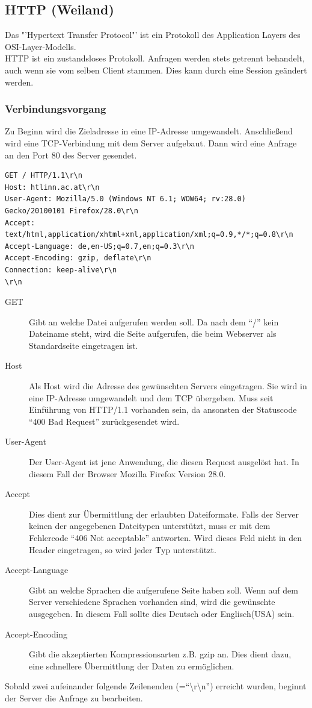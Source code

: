 \subsection{HTTP (Weiland)}

Das "'Hypertext Transfer Protocol"' ist ein Protokoll des Application Layers des OSI-Layer-Modells.
\\
HTTP ist ein zustandsloses Protokoll. Anfragen werden stets getrennt behandelt, auch wenn sie vom selben Client stammen. Dies kann durch eine Session geändert werden.
\subsubsection{Verbindungsvorgang}
Zu Beginn wird die Zieladresse in eine IP-Adresse umgewandelt.
Anschließend wird eine TCP-Verbindung  mit dem Server aufgebaut. 
Dann wird eine Anfrage an den Port 80 des Server gesendet.
\\
\begin{lstlisting}[style=custom, caption={HTTP-Request},label={lst:content_http_request}]
GET / HTTP/1.1\r\n
Host: htlinn.ac.at\r\n
User-Agent: Mozilla/5.0 (Windows NT 6.1; WOW64; rv:28.0) Gecko/20100101 Firefox/28.0\r\n
Accept: text/html,application/xhtml+xml,application/xml;q=0.9,*/*;q=0.8\r\n
Accept-Language: de,en-US;q=0.7,en;q=0.3\r\n
Accept-Encoding: gzip, deflate\r\n
Connection: keep-alive\r\n
\r\n
\end{lstlisting}

\begin{description}
\item[GET] Gibt an welche Datei aufgerufen werden soll. Da nach dem \enquote{/} kein Dateiname steht, wird die Seite aufgerufen, die beim Webserver als Standardseite eingetragen ist.
\item[Host] Als Host wird die Adresse des gewünschten Servers eingetragen. Sie wird in eine IP-Adresse umgewandelt und dem TCP übergeben. Muss seit Einführung von HTTP/1.1 vorhanden sein, da ansonsten der Statuscode \enquote{400 Bad Request} zurückgesendet wird.
\item[User-Agent] Der User-Agent ist jene Anwendung, die diesen Request ausgelöst hat. In diesem Fall der Browser Mozilla Firefox Version 28.0.
\item[Accept] Dies dient zur Übermittlung der erlaubten Dateiformate. Falls der Server keinen der angegebenen Dateitypen unterstützt, muss er mit dem Fehlercode \enquote{406 Not acceptable} antworten. Wird dieses Feld nicht in den Header eingetragen, so wird jeder Typ unterstützt.
\item[Accept-Language] Gibt an welche Sprachen die aufgerufene Seite haben soll. Wenn auf dem Server verschiedene Sprachen vorhanden sind, wird die gewünschte ausgegeben. In diesem Fall sollte dies Deutsch oder Englisch(USA) sein. 
\item[Accept-Encoding] Gibt die akzeptierten Kompressionsarten z.B. gzip an. Dies dient dazu, eine schnellere Übermittlung der Daten zu ermöglichen.
\end{description} 
Sobald zwei aufeinander folgende Zeilenenden (=\enquote{\textbackslash r\textbackslash n}) erreicht wurden, beginnt der Server die Anfrage zu bearbeiten.

